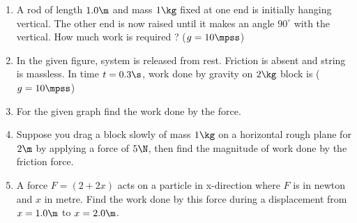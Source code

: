 \documentclass{article}
\begin{document}
\begin{enumerate}
\item A rod of length $1.0 \m$ and mass $1 \kg$ fixed at one end is initially hanging vertical. The other end is now raised until it makes an angle $90^\circ$ with the vertical. How much work is required ? ($g=10\mpss$) 

\item In the given figure, system is released from rest. Friction is absent and string is massless. In time $t=0.3\s$, work done by gravity on $2\kg$ block is ($g=10\mpss$) 
\begin{center}
\end{center}

\item For the given graph find the work done by the force.
\begin{center}
\end{center}

\item Suppose you drag a block slowly of mass $1\kg$ on a horizontal rough plane for $2\m$ by applying a force of $5\N$, then find the magnitude of work done by the friction force. 

\item A force $F = (2 + 2x)$ acts on a particle in x-direction where $F$ is in newton and $x$ in metre. Find the work done by this force during a displacement from $x = 1.0 \m$ to $x = 2.0 \m$.


\end{enumerate}
\end{document}
